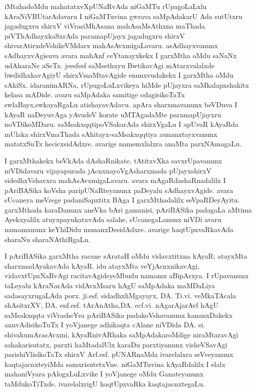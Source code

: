 iMtahadoMdu mahatatxvXpUNaRvAda niGaMTu rUpagoLaLxlu kAraNiVBUtarAdavaru I niGaMTuvina gwrava saMpAdakarU Ada sutUtxru jagadugxru shirxV viVrasiMhAsana mahAsaMsAthxna maThada piVThAdhayxkaSxrAda paramapUjayx jagadugxru shirxV shivarAtirx\break deVshikeVMdarx mahAsAvxmigaLavaru. asAdhayxvanunx sAdhayx\-vAgisuva avara mahAnf ceYtanayxkekx I garxMtha oMdu saNaNx udAharaNe aSeTx. jeesfesf saMsethxyu BwtikavAgi mAtarxvalalxde bwdidhxka\-vAgiyU shirxVmaMtavAgide enunxvudakekx I garxMtha oMdu sAkiSx. idara\break nimARNa, rUpugoLuLxvikeya hiMde pUjayxra saMkalapxshakitx kelasa mADide. avaru saMpAdaka samitige odagisikoTaTx swlaBayx,\break swkayaRgaLu atishayavAdavu. apAra sharxmavanunx beVDuva I kAyaR naDeyuvAga yAvudeV korate uMTAgadaMte parama\-pUjayxru noVDikoMDaru. saMsakxqqtipoVSakarAda shirxVgaLu I apUvaR kAyaRda mUlaka shirxVmaThada sAhitayx-saMsakxqqtiya aunanxtayx\-vanunx matatxSuTx hecicxsidAdxre. avarige namemxlalxra anaMta parxNAmagaLu.

\smallskip

I garxMthakekx beVkAda dAshaRnikate, tAtitxvXka savxrUpavanunx niVDidavaru vijayapurada jAcnxnayoVgAsharxmada pUjayx\break shirxV sidedhxVshavxra mahAsAvxmigaLavaru. avara mAgaRdashaRnadalilx I pAriBASika koVsha paripUNaRteyanunx paDeyalu sAdhayxvAgide. avara sUcaneya meVrege padaniSapxtitx BAga I garxMthadalilx seVpaRDeyAyitu.  garxMthada karaDanunx aneVka bAri gamanisi, pAriBASika padagaLa aMtima Ayekxyalilx atuyxpa\-yukatxvAda salahe, sUcanegaLanunx niVDi avaru namamxnunx keYhiDidu munanxDesidAdxre. avarige haqtUpxvaRkavAda sharaNu sharaNAthiRgaLu.

\smallskip

I pAriBASika garxMtha racane sArataH oMdu vidavxtitxna kAyaR; atayxMta sharxmadAyakavAda kAyaR. idu atayxMta veYjAcnxnika\-vAgi, vidavxtUpxNaRvAgi racitavAgideyeMbudu namamx aBipArxya. I rUpavanunx taLeyalu kAraNarAda vidAvxMsaru hAgU saMpAdaka maMDaLiya sadasayxrugaLAda porx. ji.esf. sidadhxliMgayayx, DA. Ti.vi. veMkaTAcala shAsitxrXV, DA. enf.esf. tArAnAtha,\break DA. ecf.vi. nAgarAjarAvf hAgU saMsakxqqta \hbox{viVrasheYva} pAri\-BASika padakoVshavanunx kananxDakekx anuvAdisikoTuTx I yoVjanege adhi\-kaqta cAlane niVDida DA. si. shivakumArasAvxmi, kAyaRnivARhaka saMpAdakaroMdige niraMtaravAgi sahakarisutatx, parxti haMtadalUlx karaDu parxtiyanunx visheVSavAgi parishiVlisikoTaTx shirxV Arf.esf. pUNARnaMda ivarelalxra seVveyanunx kaqtajacnxteyiMda samxrisutetxVne. niGaMTuvina kAyaRdalilx I elalx mahaniVyara pAlogxLuLxvike I yoVjanege oMdu Ganateyanunx taMdu\-koTiTxde. ivarelalxrigU haqtUpxvaRka kaqtajacnxtegaLu.

